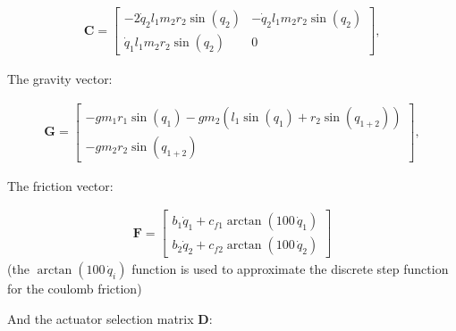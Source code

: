     \begin{equation}
    \begin{split}
    \mathbf{C} = \left[
    \begin{matrix}
    -2 \dot{q}_2 l_{1} m_{2} r_{2} \sin(q_2) & -\dot{q}_2 l_{1} m_{2} r_{2} \sin(q_2)\\
    \dot{q}_1 l_{1} m_{2} r_{2} \sin(q_2) & 0
    \end{matrix}
    \right],
    \label{eq:coriolis_matrix}
    \end{split}
    \end{equation}
    
    The gravity vector:
    
    \begin{equation}
    \begin{split}
    \mathbf{G} = \left[
    \begin{matrix}
    - g m_{1} r_{1} \sin(q_1) - g m_{2} \left(l_{1} \sin(q_1) + r_{2} \sin(q_{1+2}) \right) \\
    - g m_{2} r_{2} \sin(q_{1+2})
    \end{matrix}
    \right],
    \label{eq:gravity_matrix}
    \end{split}
    \end{equation}
    
    The friction vector:
    
    \begin{equation}
        \begin{split}
            \mathbf{F} =
            \left[
                \begin{matrix}
                    b_1 \dot{q}_1 + c_{f1} \arctan(100\,\dot{q}_1) \\
                    b_2 \dot{q}_2 + c_{f2} \arctan(100\,\dot{q}_2)
                \end{matrix}
            \right]
        \end{split}
    \end{equation}
    (the \(\arctan(100\,\dot{q}_i)\) function is used to approximate the discrete step function for the coulomb friction)

    And the actuator selection matrix \(\mathbf{D}\):
    
